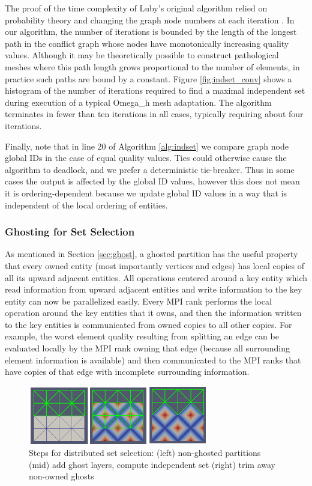 The proof of the time complexity of Luby's original algorithm
relied on probability theory and changing
the graph node numbers at each iteration \cite{luby1986simple}.
In our algorithm, the number of iterations is bounded by the
length of the longest path in the conflict graph whose nodes have monotonically
increasing quality values.
Although it may be theoretically possible to construct pathological
meshes where this path length grows proportional to the number of elements,
in practice such paths are bound by a constant.
Figure \ref{fig:indset_conv} shows a histogram of the number of
iterations required to find a maximal independent set during execution
of a typical Omega\_h mesh adaptation.
The algorithm terminates in fewer than ten iterations in all cases,
typically requiring about four iterations.

Finally, note that in line 20 of Algorithm \ref{alg:indset} we
compare graph node global IDs in the case of equal quality values.
Ties could otherwise cause the algorithm to deadlock, and we
prefer a deterministic tie-breaker.
Thus in some cases the output is affected by the global ID values,
however this does not mean it is ordering-dependent because
we update global ID values in a way that is independent
of the local ordering of entities.

\subsubsection{Ghosting for Set Selection}
\label{sec:indset_ghost}

As mentioned in Section \ref{sec:ghost}, a ghosted partition has
the useful property that every owned entity
(most importantly vertices and edges) has local copies
of all its upward adjacent entities.
All operations centered around a key entity which read information
from upward adjacent entities and write information to the
key entity can now be parallelized easily.
Every MPI rank performs the local operation around the key entities
that it owns, and then the information written to the key entities
is communicated from owned copies to all other copies.
For example, the worst element quality resulting from splitting an
edge can be evaluated locally by the MPI rank owning that edge
(because all surrounding element information is available)
and then communicated to the MPI ranks that have copies of that edge
with incomplete surrounding information.

\begin{figure}[t]\vspace*{4pt}
\centerline{
\includegraphics[width=0.7\textwidth]{mpi_indset.png}}
\caption{Steps for distributed set selection:
(left) non-ghosted partitions
(mid) add ghost layers, compute independent set
(right) trim away non-owned ghosts}\vspace*{-6pt}
\label{fig:mpi_indset}
\end{figure}

